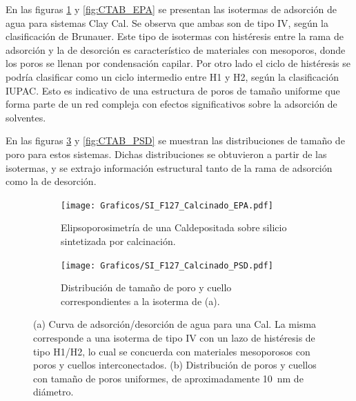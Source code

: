 		 En las figuras \ref{fig:F127_EPA} y \ref{fig:CTAB_EPA} se presentan las isotermas de adsorción de agua para sistemas Cla\pdmF\space y Cal\pdmC. Se observa que ambas son de tipo IV, según la clasificación de Brunauer\cite{Gregg1967,Violi2015,Fuertes2010}. Este tipo de isotermas con histéresis entre la rama de adsorción y la de desorción es característico de materiales con mesoporos, donde los poros se llenan por condensación capilar. Por otro lado el ciclo de histéresis se podría clasificar como un ciclo intermedio entre H1 y H2, según la clasificación IUPAC\cite{Thommes2015}. Esto es indicativo de una estructura de poros de tamaño uniforme que forma parte de un red compleja con efectos significativos sobre la adsorción de solventes.\cite{Thommes2015,Gregg1967,Lowell2004,Sing1985}

		 En las figuras \ref{fig:F127_PSD} y \ref{fig:CTAB_PSD} se muestran las distribuciones de tamaño de poro para estos sistemas. Dichas distribuciones se obtuvieron a partir de las isotermas, y se extrajo información estructural tanto de la rama de adsorción como la de desorción.


		     	  	\begin{figure}[!ht]
		     	  		\begin{subfigure}[t]{0.495\textwidth}
		     	  		\texttt{[image: Graficos/SI\_F127\_Calcinado\_EPA.pdf]}
						\caption{Elipsoporosimetría de una Cal\pdmF\space depositada sobre silicio sintetizada por calcinación.}
						\label{fig:F127_EPA}
						\end{subfigure}
						\begin{subfigure}[t]{0.495\textwidth}
		     	  		\texttt{[image: Graficos/SI\_F127\_Calcinado\_PSD.pdf]}
						\caption{Distribución de tamaño de poro y cuello correspondientes a la isoterma de (a).}
						\label{fig:F127_PSD}
						\end{subfigure}
						\caption[Elipsoporosimetría para sistemas Cal\pdmF.]{(a) Curva de adsorción/desorción de agua para una Cal\pdmF. La misma corresponde a una isoterma de tipo IV con un lazo de histéresis de tipo H1/H2, lo cual se concuerda con materiales mesoporosos con poros y cuellos interconectados. (b) Distribución de poros y cuellos con tamaño de poros uniformes, de aproximadamente \SI{10}{\nm} de diámetro.}
						\end{figure}
						

